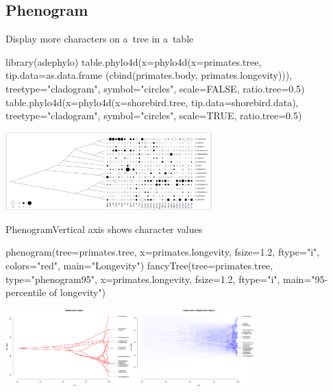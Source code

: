 \documentclass[compress, ucs, xelatex, 11pt, xcolor=svgnames, aspectratio=169,
	hyperref={
		bookmarks=true,
		unicode=true,
		colorlinks=true,
		pdftitle={Molecular data in R},
		plainpages=false,
		pdfauthor={Vojtech Zeisek},
		pdfsubject={Course about phylogeny and evolution in R},
		pdfcreator={XeLaTeX},
		pdfkeywords={R, evolution, phylogeny, molecular data},
		linkcolor=Crimson, %
		anchorcolor=Magenta, %
		citecolor=Magenta, %
		filecolor=Magenta, %
		menucolor=Magenta, %
		urlcolor=DodgerBlue, %
		pdftex},
	url={hyphens, lowtilde} %
	]{beamer}
\begin{document}
\subsection{Phenogram}

\begin{frame}[fragile]{Display more characters on a~tree in a~table}
	\begin{spluscode}
    library(adephylo)
    table.phylo4d(x=phylo4d(x=primates.tree, tip.data=as.data.frame
      (cbind(primates.body, primates.longevity))), treetype="cladogram",
      symbol="circles", scale=FALSE, ratio.tree=0.5)
    table.phylo4d(x=phylo4d(x=shorebird.tree, tip.data=shorebird.data),
      treetype="cladogram", symbol="circles", scale=TRUE, ratio.tree=0.5)
	\end{spluscode}
	\begin{center}
		\includegraphics[height=3cm]{phylotable.png}
	\end{center}
\end{frame}

\begin{frame}[fragile]{Phenogram}{Vertical axis shows character values}
	\begin{spluscode}
    phenogram(tree=primates.tree, x=primates.longevity, fsize=1.2,
      ftype="i", colors="red", main="Longevity")
    fancyTree(tree=primates.tree, type="phenogram95", x=primates.longevity,
      fsize=1.2, ftype="i", main="95-percentile of longevity")
	\end{spluscode}
	\begin{center}
		\includegraphics[height=3cm]{phenogram.png}
	\end{center}
\end{frame}
\end{document}
